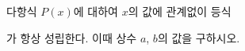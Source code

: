 다항식 $P(x)$에 대하여 $x$의 값에 관계없이 등식\par\smallskip{}\par\smallskip\noindent 가 항상 성립한다. 이때 상수 $a$, $b$의 값을 구하시오.
